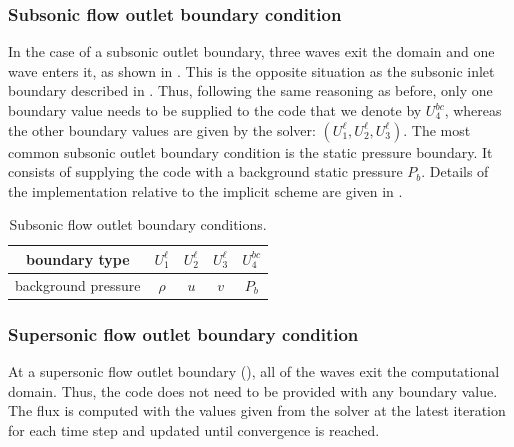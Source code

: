 \subsubsection{Subsonic flow outlet boundary condition} \label{sec:sub-flow-outlet-bc}
In the case of a subsonic outlet boundary, three waves exit the domain and one wave enters it, as shown in . This is the opposite situation as the subsonic inlet boundary described in . Thus, following the same reasoning as before, only one boundary value needs to be supplied to the code that we denote by $U_4^{bc}$, whereas the other boundary values are given by the solver: $\left(U_1^{\ell}, U_2^{\ell}, U_3^{\ell}\right)$. The most common subsonic outlet boundary condition is the static pressure boundary. It consists of supplying the code with a background static pressure $P_b$. Details of the implementation relative to the implicit scheme are given in . 
%
\begin{table}[H]
\begin{center}
\caption{ Subsonic flow outlet boundary conditions.}
\label{tbl:sub-outlet-flow-bc}
\begin{tabular}{|c|c|c|c|c|}
 \hline
boundary type & $U_1^{\ell}$  & $U_2^{\ell}$ & $U_3^{\ell}$ & $U_4^{bc}$ \\  \hline
background pressure & $\rho$     & $u$    & $v$  & $P_b$     \\  \hline
\end{tabular}
\end{center}
\end{table}
\subsubsection{Supersonic flow outlet boundary condition} \label{sec:sup-flow-outlet-bc}
At a supersonic flow outlet boundary (), all of the waves exit the computational domain. Thus, the code does not need to be provided with any boundary value. The flux is computed with the values given from the solver at the latest iteration for each time step and updated until convergence is reached. 
